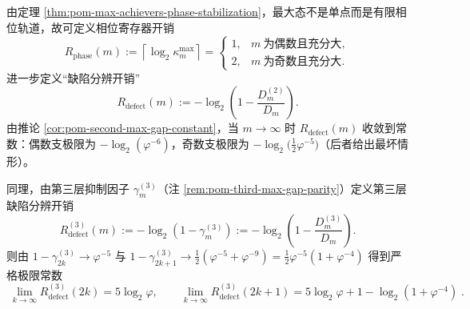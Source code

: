 \begin{remark}\label{rem:pom-phase-defect-resource-meters}
由定理 \ref{thm:pom-max-achievers-phase-stabilization}，最大态不是单点而是有限相位轨道，故可定义相位寄存器开销
\[
R_{\mathrm{phase}}(m):=\left\lceil \log_2 \kappa_m^{\mathrm{max}}\right\rceil
=
\begin{cases}
1,& m\ \text{为偶数且充分大},\\
2,& m\ \text{为奇数且充分大}.
\end{cases}
\]
进一步定义“缺陷分辨开销”
\[
R_{\mathrm{defect}}(m):=-\log_2\!\left(1-\frac{D_m^{(2)}}{D_m}\right).
\]
由推论 \ref{cor:pom-second-max-gap-constant}，当 \(m\to\infty\) 时 \(R_{\mathrm{defect}}(m)\) 收敛到常数：偶数支极限为 \(-\log_2(\varphi^{-6})\)，奇数支极限为 \(-\log_2\!\bigl(\tfrac12\varphi^{-5}\bigr)\)（后者给出最坏情形）。
\par
同理，由第三层抑制因子 \(\gamma_m^{(3)}\)（注 \ref{rem:pom-third-max-gap-parity}）定义第三层缺陷分辨开销
\[
R_{\mathrm{defect}}^{(3)}(m)
:=-\log_2\!\left(1-\gamma_m^{(3)}\right)
:=-\log_2\!\left(1-\frac{D_m^{(3)}}{D_m}\right).
\]
则由
\(
1-\gamma_{2k}^{(3)}\to \varphi^{-5}
\)
与
\(
1-\gamma_{2k+1}^{(3)}\to \tfrac12(\varphi^{-5}+\varphi^{-9})=\tfrac12\varphi^{-5}(1+\varphi^{-4})
\)
得到严格极限常数
\[
\boxed{\;
\lim_{k\to\infty}R_{\mathrm{defect}}^{(3)}(2k)=5\log_2\varphi,\qquad
\lim_{k\to\infty}R_{\mathrm{defect}}^{(3)}(2k+1)=5\log_2\varphi+1-\log_2(1+\varphi^{-4})\; }.
\]
\end{remark}

